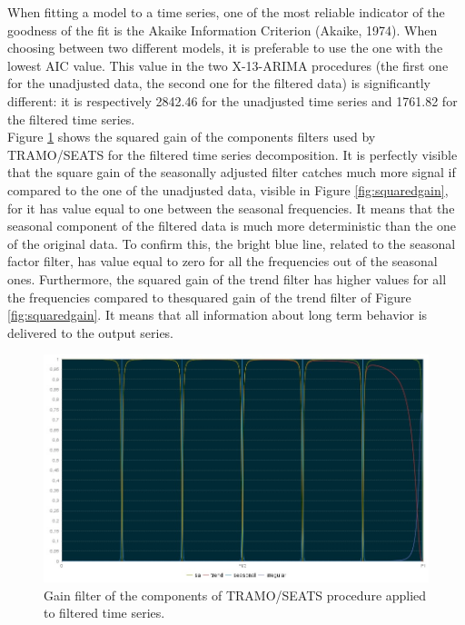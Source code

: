 \documentclass[english,blauw]{cbsdiscussionpaper}
\begin{document}
When fitting a model to a time series, one of the most reliable indicator of the goodness of the fit is the Akaike Information Criterion (Akaike, 1974). When choosing between two different models, it is preferable to use the one with the lowest AIC value. This value in the two X-13-ARIMA procedures (the first one for the unadjusted data, the second one for the filtered data) is significantly different: it is respectively 2842.46 for the unadjusted time series and 1761.82 for the filtered time series.\\Figure \ref{fig:gainfilters} shows the squared gain of the components filters used by TRAMO/SEATS for the filtered time series decomposition. It is perfectly visible that the square gain of the seasonally adjusted filter catches much more signal if compared to the one of the unadjusted data, visible in Figure \ref{fig:squaredgain}, for it has value equal to one between the seasonal frequencies. It means that the seasonal component of the filtered data is much more deterministic than the one of the original data. To confirm this, the bright blue line, related to the seasonal factor filter, has value equal to zero for all the frequencies out of the seasonal ones. Furthermore, the squared gain of the trend filter has higher values for all the frequencies compared to thesquared gain of the trend filter of Figure \ref{fig:squaredgain}. It means that all information about long term behavior is delivered to the output series.
\begin{figure}[h]
\includegraphics[width=\textwidth]{../images/capitolo4/gainfilters.jpg}
\caption{Gain filter of the components of TRAMO/SEATS procedure applied to filtered time series.}
\label{fig:gainfilters}
\end{figure}
\end{document}
